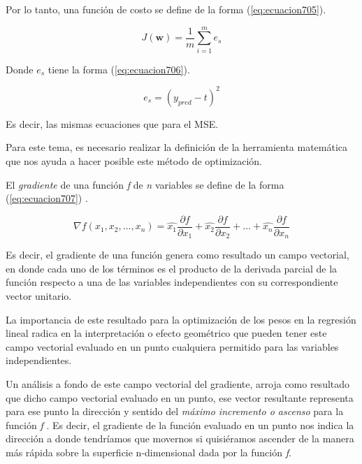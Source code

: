 Por lo tanto, una función de costo se define de la forma (\ref{eq:ecuacion705}).

\begin{equation}
	J(\textbf{w})=\frac{1}{m} \sum_{i=1}^{m}e_s
	\label{eq:ecuacion705}
\end{equation}

Donde $e_s$ tiene la forma (\ref{eq:ecuacion706}).

\begin{equation}
	e_s=(y_{pred} - t)^2
	\label{eq:ecuacion706}
\end{equation}

Es decir, las mismas ecuaciones que para el MSE.

Para este tema, es necesario realizar la definición de la herramienta matemática que nos ayuda a hacer posible este método de optimización.

El \textit{gradiente} de una función \textit{f} de \textit{n} variables se define de la forma (\ref{eq:ecuacion707}) \cite{CalculoVectorialLarson}.

\begin{equation}
	\nabla{f} (x_1,x_2,...,x_n)= \hat{x_1} \frac{\partial{f}}{\partial{x_1}} +\hat{x_2} \frac{\partial{f}}{\partial{x_2}} + ... + \hat{x_n} \frac{\partial{f}}{\partial{x_n}} 
	\label{eq:ecuacion707}
\end{equation}

Es decir, el gradiente de una función genera como resultado un campo vectorial, en donde cada uno de los términos es el producto de la derivada parcial de la función respecto a una de las variables independientes con su 
correspondiente vector unitario. 

La importancia de este resultado para la optimización de los pesos en la regresión lineal radica en la interpretación o efecto geométrico que pueden tener este campo vectorial evaluado en un punto cualquiera permitido para 
las variables independientes.

Un análisis a fondo de este campo vectorial del gradiente, arroja como resultado que dicho campo vectorial evaluado en un punto, ese vector resultante representa para ese punto la dirección y sentido del \textit{máximo incremento o ascenso} 
para la función \textit{f} \cite{CalculoVectorialDennisZill}. Es decir, el gradiente de la función evaluado en un punto nos indica la dirección a donde tendríamos que movernos si quisiéramos ascender de la manera más rápida
sobre la superficie n-dimensional dada por la función \textit{f}.


